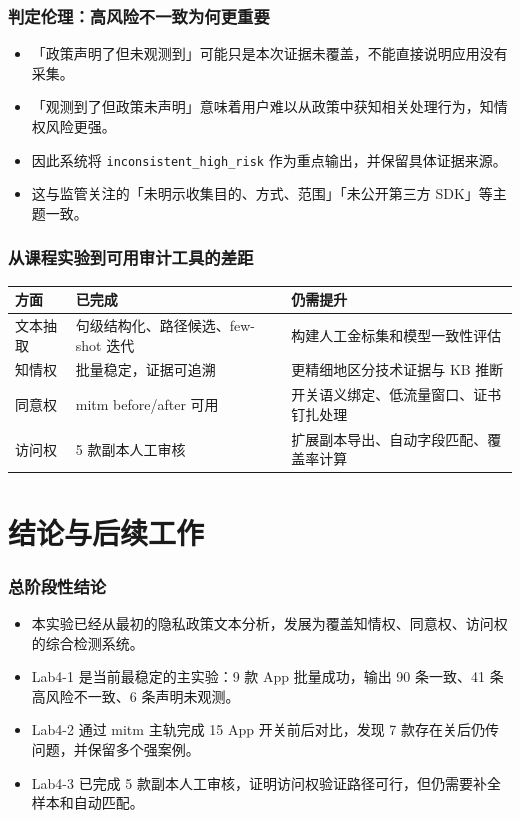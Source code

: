 \documentclass[AutoFakeBold,AutoFakeSlant]{beamer}
\newcommand{\code}[1]{\texttt{#1}}
\begin{document}
\begin{frame}
    \frametitle{判定伦理：高风险不一致为何更重要}
    \small
    \begin{itemize}
        \item 「政策声明了但未观测到」可能只是本次证据未覆盖，不能直接说明应用没有采集。
        \item 「观测到了但政策未声明」意味着用户难以从政策中获知相关处理行为，知情权风险更强。
        \item 因此系统将 \code{inconsistent\_high\_risk} 作为重点输出，并保留具体证据来源。
        \item 这与监管关注的「未明示收集目的、方式、范围」「未公开第三方 SDK」等主题一致。
    \end{itemize}
\end{frame}

\begin{frame}
    \frametitle{从课程实验到可用审计工具的差距}
    \small
    \begin{tabularx}{\textwidth}{|l|X|X|}
        \hline
        \textbf{方面} & \textbf{已完成} & \textbf{仍需提升} \\
        \hline
        文本抽取 & 句级结构化、路径候选、few-shot 迭代 & 构建人工金标集和模型一致性评估 \\
        \hline
        知情权 & 批量稳定，证据可追溯 & 更精细地区分技术证据与 KB 推断 \\
        \hline
        同意权 & mitm before/after 可用 & 开关语义绑定、低流量窗口、证书钉扎处理 \\
        \hline
        访问权 & 5 款副本人工审核 & 扩展副本导出、自动字段匹配、覆盖率计算 \\
        \hline
    \end{tabularx}
\end{frame}

\section{结论与后续工作}

\begin{frame}
    \frametitle{总阶段性结论}
    \small
    \begin{itemize}
        \item 本实验已经从最初的隐私政策文本分析，发展为覆盖知情权、同意权、访问权的综合检测系统。
        \item Lab4-1 是当前最稳定的主实验：9 款 App 批量成功，输出 90 条一致、41 条高风险不一致、6 条声明未观测。
        \item Lab4-2 通过 mitm 主轨完成 15 App 开关前后对比，发现 7 款存在关后仍传问题，并保留多个强案例。
        \item Lab4-3 已完成 5 款副本人工审核，证明访问权验证路径可行，但仍需要补全样本和自动匹配。
    \end{itemize}
\end{frame}
\end{document}
